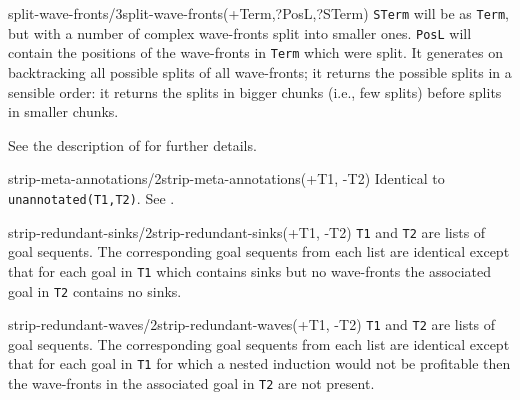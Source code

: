 \begin{predicate}{split-wave-fronts/3}{split-wave-fronts(+Term,?PosL,?STerm)}%
{\tt STerm} will be as {\tt Term}, but with a number of complex
wave-fronts split into smaller ones. {\tt PosL} will contain the
positions of the wave-fronts in {\tt Term} which were split. It
generates on backtracking all possible splits of all wave-fronts; it
returns the possible splits in a sensible order: it returns the splits
in bigger chunks (i.e., few splits) before splits in smaller chunks.

See the description of   for further details.



\end{predicate}

\begin{predicate}{strip-meta-annotations/2}{strip-meta-annotations(+T1, -T2)}%
Identical to {\tt unannotated(T1,T2)}.  See .
\end{predicate}

\begin{predicate}{strip-redundant-sinks/2}{strip-redundant-sinks(+T1, -T2)}%
{\tt T1} and {\tt T2} are lists of goal sequents. The corresponding
goal sequents from each list are identical except that for each goal
in {\tt T1} which contains sinks but no wave-fronts the associated
goal in {\tt T2} contains no sinks.
\end{predicate}

\begin{predicate}{strip-redundant-waves/2}{strip-redundant-waves(+T1, -T2)}%
{\tt T1} and {\tt T2} are lists of goal sequents. The corresponding
goal sequents from each list are identical except that for each goal
in {\tt T1} for which a nested induction would not be profitable then
the wave-fronts in the associated goal in {\tt T2} are not present.
\end{predicate}

\iffalse
\begin{predicate}{subsumes/2}{subsumes(+S1, +S2)}%
Induction scheme {\tt S1} subsumes induction scheme {\tt S2}. The
proper definition of subsumption is unclear at \notnice the moment, so
we just resort to equating scheme subsumption with term instantiation:
{\tt S1} subsumes {\tt S2} iff {\tt S1} is an instantiation of {\tt
S2}. See~\cite{pub419} for a detailed explanation about induction
schemes.
\end{predicate}
\fi

